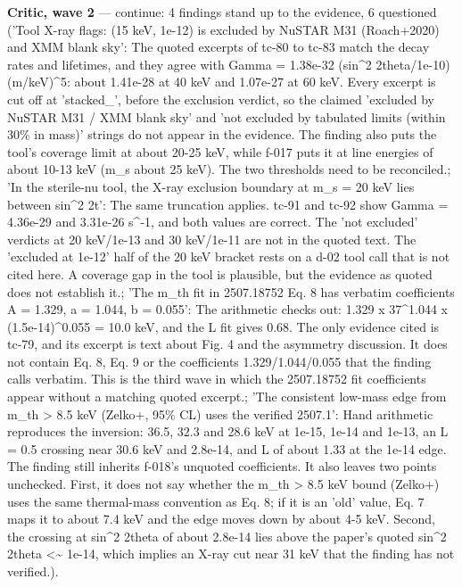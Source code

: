 \documentclass[11pt,a4paper]{article}
\begin{document}
\textbf{Critic, wave 2} --- continue: 4 findings stand up to the evidence, 6 questioned ('Tool X-ray flags: (15 keV, 1e-12) is excluded by NuSTAR M31 (Roach+2020) and XMM blank sky': The quoted excerpts of tc-80 to tc-83 match the decay rates and lifetimes, and they agree with Gamma = 1.38e-32 (sin\textasciicircum{}2 2theta/1e-10)(m/keV)\textasciicircum{}5: about 1.41e-28 at 40 keV and 1.07e-27 at 60 keV. Every excerpt is cut off at 'stacked\_', before the exclusion verdict, so the claimed 'excluded by NuSTAR M31 / XMM blank sky' and 'not excluded by tabulated limits (within 30\% in mass)' strings do not appear in the evidence. The finding also puts the tool's coverage limit at about 20-25 keV, while f-017 puts it at line energies of about 10-13 keV (m\_s about 25 keV). The two thresholds need to be reconciled.; 'In the sterile-nu tool, the X-ray exclusion boundary at m\_s = 20 keV lies between sin\textasciicircum{}2 2t': The same truncation applies. tc-91 and tc-92 show Gamma = 4.36e-29 and 3.31e-26 s\textasciicircum{}-1, and both values are correct. The 'not excluded' verdicts at 20 keV/1e-13 and 30 keV/1e-11 are not in the quoted text. The 'excluded at 1e-12' half of the 20 keV bracket rests on a d-02 tool call that is not cited here. A coverage gap in the tool is plausible, but the evidence as quoted does not establish it.; 'The m\_th fit in 2507.18752 Eq. 8 has verbatim coefficients A = 1.329, a = 1.044, b = 0.055': The arithmetic checks out: 1.329 x 37\textasciicircum{}1.044 x (1.5e-14)\textasciicircum{}0.055 = 10.0 keV, and the L fit gives 0.68. The only evidence cited is tc-79, and its excerpt is text about Fig. 4 and the asymmetry discussion. It does not contain Eq. 8, Eq. 9 or the coefficients 1.329/1.044/0.055 that the finding calls verbatim. This is the third wave in which the 2507.18752 fit coefficients appear without a matching quoted excerpt.; 'The consistent low-mass edge from m\_th \textgreater{} 8.5 keV (Zelko+, 95\% CL) uses the verified 2507.1': Hand arithmetic reproduces the inversion: 36.5, 32.3 and 28.6 keV at 1e-15, 1e-14 and 1e-13, an L = 0.5 crossing near 30.6 keV and 2.8e-14, and L of about 1.33 at the 1e-14 edge. The finding still inherits f-018's unquoted coefficients. It also leaves two points unchecked. First, it does not say whether the m\_th \textgreater{} 8.5 keV bound (Zelko+) uses the same thermal-mass convention as Eq. 8; if it is an 'old' value, Eq. 7 maps it to about 7.4 keV and the edge moves down by about 4-5 keV. Second, the crossing at sin\textasciicircum{}2 2theta of about 2.8e-14 lies above the paper's quoted sin\textasciicircum{}2 2theta \textless{}\textasciitilde{} 1e-14, which implies an X-ray cut near 31 keV that the finding has not verified.).
\end{document}
